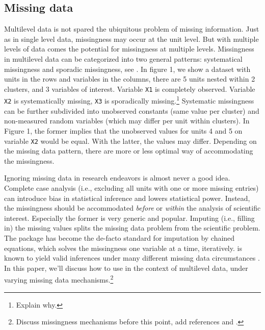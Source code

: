 \documentclass[
]{jss}
\begin{document}
\hypertarget{missing-data}{%
\subsection{Missing data}\label{missing-data}}

Multilevel data is not spared the ubiquitous problem of missing
information. Just as in single level data, missingness may occur at the
unit level. But with multiple levels of data comes the potential for
missingness at multiple levels. Missingness in multilevel data can be
categorized into two general patterns: systematical missingness and
sporadic missingness, see \citet{resc13}. In figure 1, we show a dataset
with units in the rows and variables in the columns, there are 5 units
nested within 2 clusters, and 3 variables of interest. Variable
\texttt{X1} is completely observed. Variable \texttt{X2} is
systematically missing, \texttt{X3} is sporadically missing.\footnote{Explain
  why.} Systematic missingness can be further subdivided into unobserved
constants (same value per cluster) and non-measured random variables
(which may differ per unit within clusters). In Figure 1, the former
implies that the unobserved values for units 4 and 5 on variable
\texttt{X2} would be equal. With the latter, the values may differ.
Depending on the missing data pattern, there are more or less optimal
way of accommodating the missingness.

Ignoring missing data in research endeavors is almost never a good idea.
Complete case analysis (i.e., excluding all units with one or more
missing entries) can introduce bias in statistical inference and lowers
statistical power. Instead, the missingness should be accommodated
\emph{before} or \emph{within} the analysis of scientific interest.
Especially the former is very generic and popular. Imputing (i.e.,
filling in) the missing values splits the missing data problem from the
scientific problem. The  package  has become the
de-facto standard for imputation by chained equations, which solves the
missingness one variable at a time, iteratively.  is known to
yield valid inferences under many different missing data circumstances
\citep{buur18}. In this paper, we'll discuss how to use  in
the context of multilevel data, under varying missing data
mechanisms.\footnote{Discuss missingness mechanisms before this point,
  add references \citet{yuce08} and \citet{hox15}.}
\end{document}
